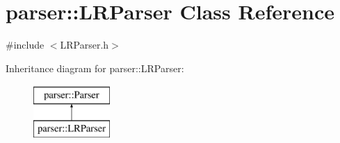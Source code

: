\hypertarget{classparser_1_1LRParser}{\section{parser\-:\-:\-L\-R\-Parser \-Class \-Reference}
\label{d6/d50/classparser_1_1LRParser}
}


{\ttfamily \#include $<$\-L\-R\-Parser.\-h$>$}

\-Inheritance diagram for parser\-:\-:\-L\-R\-Parser\-:\begin{figure}[H]
\begin{center}
\leavevmode
\includegraphics[height=2.000000cm]{d6/d50/classparser_1_1LRParser}
\end{center}
\end{figure}
